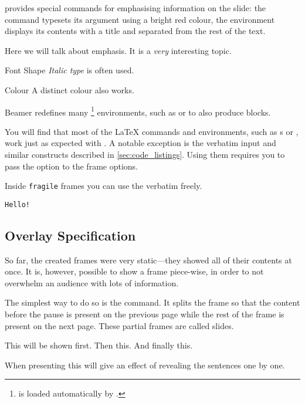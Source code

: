  provides special commands for emphasising information on the slide:
the  command typesets its argument using a bright red colour, the
 environment displays its contents with a title and separated from
the rest of the text.
\begin{example}
\begin{frame} %
Here we will talk about
\alert{emphasis}. It is a
\emph{very} interesting topic.
\begin{block}{Font Shape}
  \emph{Italic type} is often
  used.
\end{block}
\begin{block}{Colour}
  A distinct \alert{colour}
  also works.
\end{block}
\end{frame} %
\end{example}
Beamer redefines many \footnote{ is loaded
  automatically by .} environments, such as  or
 to also produce blocks.

You will find that most of the \LaTeX{} commands and environments, such as
s or , work just as expected with . A notable
exception is the verbatim input and similar constructs described in
\autoref{sec:code_listings}. Using them requires you to pass the
 option to the frame options.
\begin{example}
\begin{frame}[fragile]
  Inside \verb|fragile| frames
  you can use the verbatim
  freely.
  \begin{verbatim}
Hello!
  \end{verbatim}
\end{frame}
\end{example}

\subsection{Overlay Specification}

So far, the created frames were very static---they showed all of their contents
at once. It is, however, possible to show a frame piece-wise, in order to not
overwhelm an audience with lots of information.

The simplest way to do so is the  command. It splits the frame so
that the content before the pause is present on the previous page while the
rest of the frame is present on the next page. These partial frames are called
slides.
\begin{example}[
  vertical_mode,
  to_page=3,
  paperheight=2.8cm,
  paperwidth=3.7cm,
  examplewidth=.95\linewidth,
]
\begin{frame}
  This will be shown first. \pause Then this. \pause
  And finally this.
\end{frame}
\end{example}
When presenting this will give an effect of revealing the sentences one by one.

